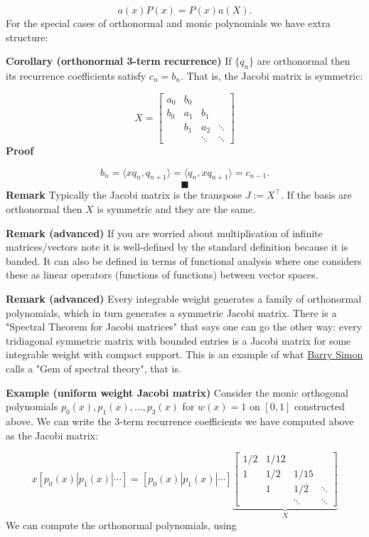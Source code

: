 \documentclass[12pt,a4paper]{article}
\begin{document}
\[
a(x) P(x) = P(x) a(X).
\]
For the special cases of orthonormal and monic polynomials we have extra structure:

\textbf{Corollary (orthonormal 3-term recurrence)} If $\{q_n\}$ are orthonormal then its recurrence coefficients satisfy $c_n = b_n$. That is, the Jacobi matrix is symmetric:

\[
X = \begin{bmatrix} a_0 & b_0 \\
                                                        b_0 & a_1 & b_1\\
                                                        & b_1 & a_2 & \ensuremath{\ddots} \\
                                                        && \ensuremath{\ddots} & \ensuremath{\ddots}
                                                        \end{bmatrix}
\]
\textbf{Proof}

\[
b_n = \ensuremath{\langle}x q_n, q_{n+1}\ensuremath{\rangle} = \ensuremath{\langle}q_n, x q_{n+1}\ensuremath{\rangle} = c_{n-1}.
\]
\[
\blacksquare
\]
\textbf{Remark} Typically the Jacobi matrix is the transpose $J := X^\ensuremath{\top}$. If the basis are orthonormal then $X$ is symmetric and they are the same.

\textbf{Remark (advanced)} If you are worried about multiplication of infinite matrices/vectors note it is well-defined by the standard definition because it is banded. It can also be defined in terms of functional analysis where one considers these as linear operators (functions of functions) between vector spaces.

\textbf{Remark (advanced)} Every integrable weight generates a family of orthonormal polynomials, which in turn generates a symmetric Jacobi matrix. There is a "Spectral Theorem for Jacobi matrices" that says one can go the other way: every tridiagonal symmetric matrix with bounded entries is a Jacobi matrix for some integrable weight with compact support. This is an example of what \href{https://en.wikipedia.org/wiki/Barry_Simon}{Barry Simon} calls a "Gem of spectral theory", that is.

\textbf{Example (uniform weight Jacobi matrix)} Consider the monic orthogonal polynomials $p_0(x),p_1(x),\ensuremath{\ldots},p_3(x)$ for $w(x) = 1$ on $[0,1]$ constructed above. We can write the 3-term recurrence coefficients we have computed above as the Jacobi matrix:

\[
x [p_0(x)| p_1(x)| \ensuremath{\cdots}] = [p_0(x)| p_1(x)| \ensuremath{\cdots}] \underbrace{\begin{bmatrix} 1/2 & 1/12 \\
                                                            1 & 1/2 & 1/15 \\
                                                            & 1 & 1/2 & \ensuremath{\ddots} \\
                                                            & & \ensuremath{\ddots} & \ensuremath{\ddots} \end{bmatrix}}_X
\]
We can compute the orthonormal polynomials, using
\end{document}
